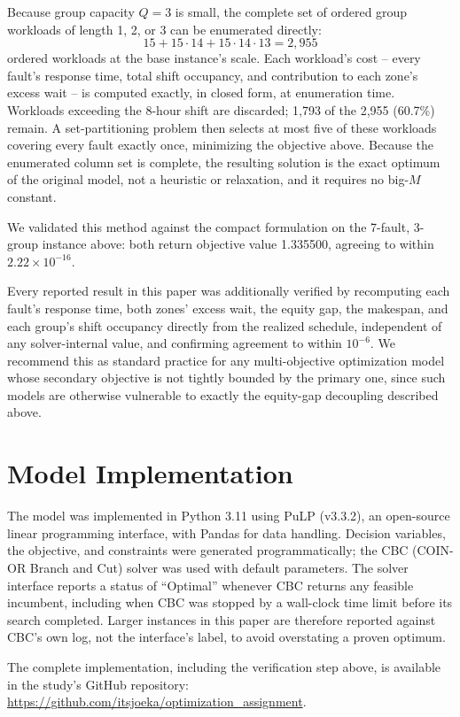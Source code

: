 \documentclass[11pt]{article}
\begin{document}
Because group capacity $Q=3$ is small, the complete set of ordered group workloads of length 1, 2, or 3 can be enumerated directly:
\[
15 + 15\cdot14 + 15\cdot14\cdot13 = 2{,}955
\]
ordered workloads at the base instance's scale. Each workload's cost -- every fault's response time, total shift occupancy, and contribution to each zone's excess wait -- is computed exactly, in closed form, at enumeration time. Workloads exceeding the 8-hour shift are discarded; 1{,}793 of the 2{,}955 (60.7\%) remain. A set-partitioning problem then selects at most five of these workloads covering every fault exactly once, minimizing the objective above. Because the enumerated column set is complete, the resulting solution is the exact optimum of the original model, not a heuristic or relaxation, and it requires no big-$M$ constant.

We validated this method against the compact formulation on the 7-fault, 3-group instance above: both return objective value 1.335500, agreeing to within $2.22\times10^{-16}$.

Every reported result in this paper was additionally verified by recomputing each fault's response time, both zones' excess wait, the equity gap, the makespan, and each group's shift occupancy directly from the realized schedule, independent of any solver-internal value, and confirming agreement to within $10^{-6}$. We recommend this as standard practice for any multi-objective optimization model whose secondary objective is not tightly bounded by the primary one, since such models are otherwise vulnerable to exactly the equity-gap decoupling described above.

\section*{Model Implementation}

The model was implemented in Python 3.11 using PuLP (v3.3.2), an open-source linear programming interface, with Pandas for data handling. Decision variables, the objective, and constraints were generated programmatically; the CBC (COIN-OR Branch and Cut) solver was used with default parameters. The solver interface reports a status of ``Optimal'' whenever CBC returns any feasible incumbent, including when CBC was stopped by a wall-clock time limit before its search completed. Larger instances in this paper are therefore reported against CBC's own log, not the interface's label, to avoid overstating a proven optimum.

The complete implementation, including the verification step above, is available in the study's GitHub repository: \url{https://github.com/itsjoeka/optimization_assignment}.
\end{document}
